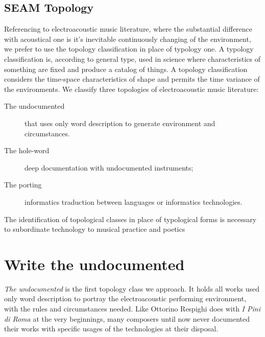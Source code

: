 \documentclass[twoside,a4paper]{article}
\begin{document}
\subsection{SEAM Topology}

Referencing to electroacoustic music literature, where the substantial difference with acoustical one is it's inevitable continuously changing of the environment, we prefer to use the topology classification in place of typology one. A typology classification is, according to general type, used in science where characteristics of something are fixed and produce a catalog of things. A topology classification considers the time-space characteristics of shape and permits the time variance of the environments. We classify three topologies of electroacoustic music literature: 

\begin{description}
  \item[The undocumented] that uses only word description to generate environment and circumstances.
  \item[The hole-word] deep documentation with undocumented instruments;
  \item[The porting] informatics traduction between languages or informatics technologies.
\end{description}

The identification of topological classes in place of typological forms is necessary to subordinate technology to musical practice and poetics


\section{Write the undocumented}
\label{sec:writing}

\emph{The undocumented} is the first topology class we approach. It holds all works used only word description to portray the electroacoustic performing environment, with the rules and circumstances needed. Like Ottorino Respighi does with \emph{I Pini di Roma} at the very beginnings, many composers until now never documented their works with specific usages of the technologies at their disposal. 
\end{document}
